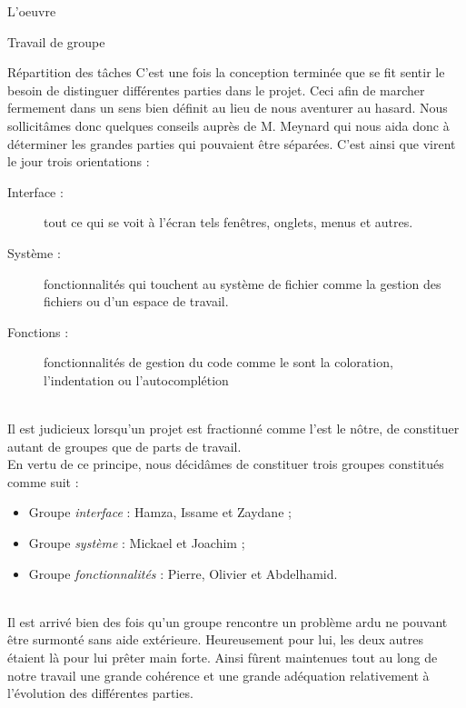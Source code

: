 \documentclass[a4paper, 12pt]{report}
\begin{document}
	\begin{part}{L'oeuvre}
		\begin{chapter}{Travail de groupe}
			\begin{section}{Répartition des tâches}
				C'est une fois la conception terminée que se fit sentir le besoin de distinguer différentes parties dans le projet. Ceci afin de
				marcher fermement dans un sens bien définit au lieu de nous aventurer au hasard.
				Nous sollicitâmes donc quelques conseils auprès de M. Meynard qui nous aida donc à déterminer les grandes parties qui pouvaient 
				être séparées. C'est ainsi que virent le jour trois orientations :\\
				\begin{description}
					\item[Interface :] tout ce qui se voit à l'écran tels fenêtres, onglets, menus et autres.
					\item[Système :] fonctionnalités qui touchent au système de fichier comme la gestion des fichiers ou d'un espace de travail.
					\item[Fonctions :] fonctionnalités de gestion du code comme le sont la coloration, l'indentation ou l'\gls{autocomplétion}
				\end{description}~\\


				Il est judicieux lorsqu'un projet est fractionné comme l'est le nôtre, de constituer autant de groupes que de parts de travail.\\
				En vertu de ce principe, nous décidâmes de constituer trois groupes constitués comme suit :\\

				\begin{itemize}
					\item Groupe \emph{interface} : Hamza, Issame et Zaydane ;
					\item Groupe \emph{système} : Mickael et Joachim ;
					\item Groupe \emph{fonctionnalités} : Pierre, Olivier et Abdelhamid.
				\end{itemize}~\\

				Il est arrivé bien des fois qu'un groupe rencontre un problème ardu ne pouvant être surmonté sans aide extérieure.
				Heureusement pour lui, les deux autres étaient là pour lui prêter main forte. Ainsi fûrent maintenues tout au long de notre travail
				une grande cohérence et une grande adéquation relativement à l'évolution des différentes parties.\\



\end{section}
\end{chapter}
\end{part}
\end{document}
